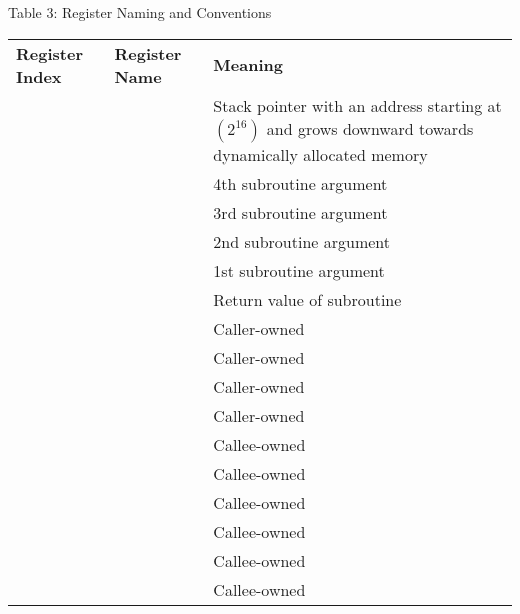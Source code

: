 \documentclass{article}
\begin{document}
\vspace{0.5in}

\large{Table 3: Register Naming and Conventions}
\centering
\footnotesize
\renewcommand{\arraystretch}{1.4}
\begin{longtable}{ | l | l | P{2.3in} | }
\hline
\textbf{Register Index} & \textbf{Register Name} & \textbf{Meaning} \\ 
 &  & Stack pointer with an address starting at  $(2^{16})$ and grows downward towards dynamically allocated memory \\ \hline
{} &  & 4th subroutine argument \\ \hline
{} &  & 3rd subroutine argument \\ \hline
{} &  & 2nd subroutine argument \\ \hline
{} &  & 1st subroutine argument \\ \hline
{} &  & Return value of subroutine \\ \hline
{} &  & Caller-owned \\ \hline
{} &  & Caller-owned \\ \hline
{} &  & Caller-owned \\ \hline
{} &  & Caller-owned \\ \hline
{} &  & Callee-owned \\ \hline
{} &  & Callee-owned \\ \hline
{} &  & Callee-owned \\ \hline
{} &  & Callee-owned \\ \hline
{} &  & Callee-owned \\ \hline
{} &  & Callee-owned \\ \hline
\end{longtable}
\end{document}
